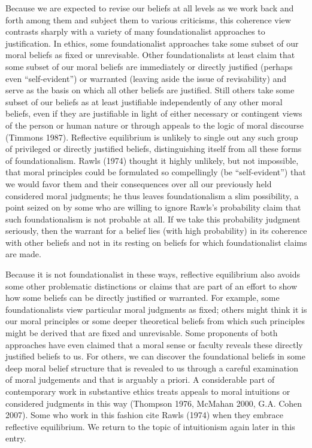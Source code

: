 \documentclass[]{article}
\begin{document}
Because we are expected to revise our beliefs at all levels as we work
back and forth among them and subject them to various criticisms, this
coherence view contrasts sharply with a variety of many foundationalist
approaches to justification. In ethics, some foundationalist approaches
take some subset of our moral beliefs as fixed or unrevisable. Other
foundationalists at least claim that some subset of our moral beliefs
are immediately or directly justified (perhaps even ``self-evident'') or
warranted (leaving aside the issue of revisability) and serve as the
basis on which all other beliefs are justified. Still others take some
subset of our beliefs as at least justifiable independently of any other
moral beliefs, even if they are justifiable in light of either necessary
or contingent views of the person or human nature or through appeals to
the logic of moral discourse (Timmons 1987). Reflective equilibrium is
unlikely to single out any such group of privileged or directly
justified beliefs, distinguishing itself from all these forms of
foundationalism. Rawls (1974) thought it highly unlikely, but not
impossible, that moral principles could be formulated so compellingly
(be ``self-evident'') that we would favor them and their consequences
over all our previously held considered moral judgments; he thus leaves
foundationalism a slim possibility, a point seized on by some who are
willing to ignore Rawls's probability claim that such foundationalism is
not probable at all. If we take this probability judgment seriously,
then the warrant for a belief lies (with high probability) in its
coherence with other beliefs and not in its resting on beliefs for which
foundationalist claims are made.

Because it is not foundationalist in these ways, reflective equilibrium
also avoids some other problematic distinctions or claims that are part
of an effort to show how some beliefs can be directly justified or
warranted. For example, some foundationalists view particular moral
judgments as fixed; others might think it is our moral principles or
some deeper theoretical beliefs from which such principles might be
derived that are fixed and unrevisable. Some proponents of both
approaches have even claimed that a moral sense or faculty reveals these
directly justified beliefs to us. For others, we can discover the
foundational beliefs in some deep moral belief structure that is
revealed to us through a careful examination of moral judgements and
that is arguably a priori. A considerable part of contemporary work in
substantive ethics treats appeals to moral intuitions or considered
judgments in this way (Thompson 1976, McMahan 2000, G.A. Cohen 2007).
Some who work in this fashion cite Rawls (1974) when they embrace
reflective equilibrium. We return to the topic of intuitionism again
later in this entry.
\end{document}
